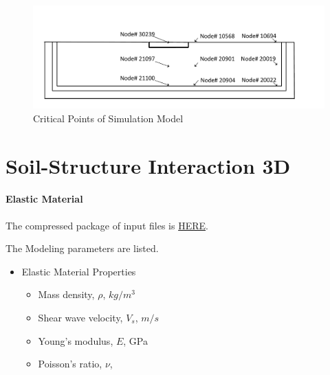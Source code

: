 \begin{figure}[H]
  \centering
  \includegraphics[width = 12cm]{./Figure-files/nonlinear_analysis_steps/soil-foundation/soil_foundation_node_location.pdf}
  \caption{Critical Points of Simulation Model}
  \label{fig_points_soil_foundation}
\end{figure}









\clearpage
\newpage
\section{Soil-Structure Interaction 3D}
\label{ssi_3D}


\paragraph{Elastic Material}
The compressed package of input files is  
\href{https://github.com/yuan-energy/Real-ESSI-Short-Course-Examples/tree/master/short-course-examples/nonlinear_analysis_steps/soil-structure/elastic/elastic.tgz?raw=true}{HERE}. 

The Modeling parameters are listed.
\begin{itemize}
  \item Elastic Material Properties 
  \begin{itemize}
    \item Mass density, $\rho$, \enspace {} $kg/m^3$
    \item Shear wave velocity, $V_s$, \enspace {} $m/s$
    \item Young's modulus, $E$, \enspace {} GPa
    \item Poisson's ratio, $\nu$, \enspace {}
  \end{itemize}
\end{itemize}


